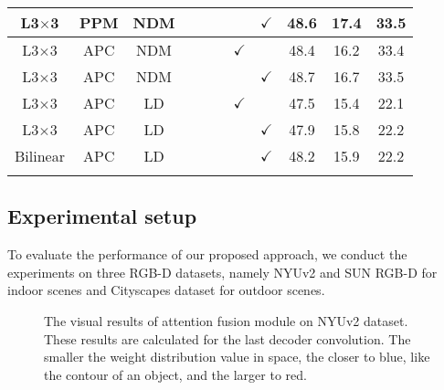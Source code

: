 \documentclass[journal,twoside,web]{ieeecolor}
\begin{document}
\begin{table*}[!t]
\begin{tabular}{ccccccccccc}
		L3$\times$3&PPM&NDM&&&&&\multicolumn{1}{c}{\multirow{1}{*}{$\checkmark$}}&48.6&17.4&33.5\\
    \midrule
L3$\times$3&APC&NDM&&&&\multicolumn{1}{c}{\multirow{1}{*}{$\checkmark$}}&    &48.4 &16.2&33.4 \\	
		L3$\times$3 &APC&NDM& & && &\multicolumn{1}{c}{\multirow{1}{*}{$\checkmark$}}&48.7&16.7&33.5\\
    \midrule 
L3$\times$3&APC&LD&&&&\multicolumn{1}{c}{\multirow{1}{*}{$\checkmark$}}&&47.5&15.4&22.1 \\
	  L3$\times$3&APC&LD&&&&&\multicolumn{1}{c}{\multirow{1}{*}{$\checkmark$}}&47.9&15.8&22.2\\
Bilinear &APC&LD&&&& &\multicolumn{1}{c}{\multirow{1}{*}{$\checkmark$}}&48.2&15.9&22.2 \\
	\bottomrule
\label{tab:AFM}
	\end{tabular}
\end{table*}

\subsection{Experimental setup}
To evaluate the performance of our proposed approach, we conduct the experiments on three RGB-D datasets, namely NYUv2 \cite{NYUv2}  and SUN RGB-D \cite{SUNRGB-D} for indoor scenes and Cityscapes \cite{Cityscapes} dataset for outdoor scenes. 
\begin{figure*}[!t]
	\centering
	\hspace{-0.60em}
	\hspace{-0.55em}
	\hspace{-0.55em}
	\hspace{-0.55em}
	\hspace{-0.55em}
	\hspace{-0.55em}
	\caption{The visual results of attention fusion module on NYUv2 dataset. These results are calculated for the last decoder convolution. The smaller the weight distribution value in space, the closer to blue, like the contour of an object, and the larger to red.}
	\label{AFM}
\end{figure*}
\end{document}
